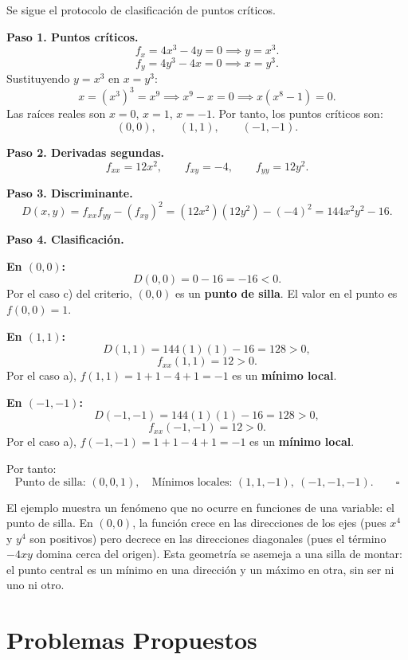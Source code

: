 \begin{myproof}
Se sigue el protocolo de clasificación de puntos críticos.

\textbf{Paso 1. Puntos críticos.}
\[
f_x = 4x^3 - 4y = 0 \implies y = x^3.
\]
\[
f_y = 4y^3 - 4x = 0 \implies x = y^3.
\]
Sustituyendo $y=x^3$ en $x=y^3$:
\[
x = (x^3)^3 = x^9 \implies x^9 - x = 0 \implies x(x^8 - 1)=0.
\]
Las raíces reales son $x=0$, $x=1$, $x=-1$. Por tanto, los puntos
críticos son:
\[
(0,0),\qquad (1,1),\qquad (-1,-1).
\]

\textbf{Paso 2. Derivadas segundas.}
\[
f_{xx} = 12x^2,\qquad f_{xy} = -4,\qquad f_{yy} = 12y^2.
\]

\textbf{Paso 3. Discriminante.}
\[
D(x,y) = f_{xx} f_{yy} - (f_{xy})^2
= (12x^2)(12y^2) - (-4)^2
= 144x^2 y^2 - 16.
\]

\textbf{Paso 4. Clasificación.}

\textbf{En $(0,0)$:}
\[
D(0,0) = 0 - 16 = -16 < 0.
\]
Por el caso c) del criterio, $(0,0)$ es un \textbf{punto de silla}.
El valor en el punto es $f(0,0)=1$.

\textbf{En $(1,1)$:}
\[
D(1,1) = 144(1)(1) - 16 = 128 > 0,
\]
\[
f_{xx}(1,1) = 12 > 0.
\]
Por el caso a), $f(1,1) = 1 + 1 - 4 + 1 = -1$ es un
\textbf{mínimo local}.

\textbf{En $(-1,-1)$:}
\[
D(-1,-1) = 144(1)(1) - 16 = 128 > 0,
\]
\[
f_{xx}(-1,-1) = 12 > 0.
\]
Por el caso a), $f(-1,-1) = 1 + 1 - 4 + 1 = -1$ es un
\textbf{mínimo local}.

Por tanto:
\[
\boxed{
\text{Punto de silla: } (0,0,1),\quad
\text{Mínimos locales: } (1,1,-1),\ (-1,-1,-1)
}.
\qquad\square
\]
\end{myproof}

\begin{rem}
El ejemplo muestra un fenómeno que no ocurre en funciones de una
variable: el punto de silla. En $(0,0)$, la función crece en las
direcciones de los ejes (pues $x^4$ y $y^4$ son positivos) pero decrece
en las direcciones diagonales (pues el término $-4xy$ domina cerca del
origen). Esta geometría se asemeja a una silla de montar: el punto
central es un mínimo en una dirección y un máximo en otra, sin ser ni uno
ni otro.
\end{rem}

\section{Problemas Propuestos}

